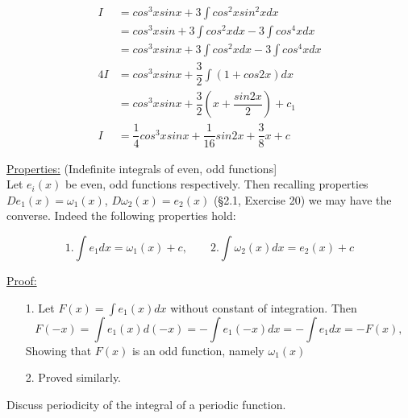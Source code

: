 \documentclass[11pt]{amsbook}
\begin{document}
\begin{align*}
	I &= cos^3 x sinx + 3 \int cos^2 x sin^2 x dx \\
	&= cos^3 x sin + 3 \int cos^2 x dx - 3 \int cos^4 x dx \\
	&= cos^3 x sinx + 3 \int cos^2 x dx - 3 \int cos^4 x dx \\
	4I &= cos^3 x sinx + \dfrac{3}{2} \int (1+cos 2x) dx \\
	&= cos^3 x sinx + \dfrac{3}{2} (x+\dfrac{sin 2x}{2})+c_1 \\
	I &= \dfrac{1}{4} cos^3 x sinx + \dfrac{1}{16} sin 2x + \dfrac{3}{8} x + c
\end{align*}

\underline{Properties:} (Indefinite integrals of even, odd functions] \\
Let $e_i(x)$ be even, odd functions respectively. Then recalling properties $De_1(x)=\omega_1(x)$, $D\omega_2(x)=e_2(x)$ (\S 2.1, Exercise 20) we may have the converse. Indeed the following properties hold:

\begin{equation*}
	1. \int e_1dx = \omega_1(x)+c, \qquad 2. \int \omega_2(x) dx = e_2(x)+c
\end{equation*}

\underline{Proof:}
\begin{enumerate}
	\item[1.] Let $F(x)=\int e_1 (x) dx$ without constant of integration. Then
	\begin{equation*}
		F(-x) = \int e_1(x)d(-x) = -\int e_1(-x)dx = -\int e_1 dx = -F(x),
	\end{equation*}
	Showing that $F(x)$ is an odd function, namely $\omega_1(x)$
	
	\item[2.] Proved similarly. \unskip\nobreak\quad\qedsymbol
\end{enumerate}
Discuss periodicity of the integral of a periodic function.
\end{document}
